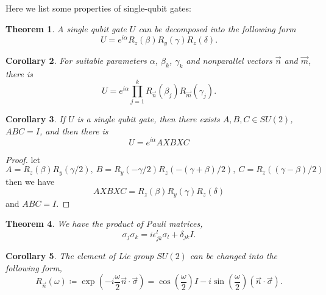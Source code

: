 \documentclass[a4paper,10pt]{book}
\newtheorem{theorem}{Theorem}[section]
\newtheorem{corollary}[theorem]{Corollary}
\numberwithin{equation}{section}
\begin{document}
Here we list some properties of single-qubit gates:
\begin{theorem}\label{the:EulerAngle}
    A single qubit gate $U$ can be decomposed into the following form
    \begin{equation}
        U=e^{i\alpha}R_{z}(\beta)R_{y}(\gamma)R_{z}(\delta).
    \end{equation}
\end{theorem}
\begin{corollary}\label{cor:DecompositionByTwoAxis}
    For suitable parameters $\alpha$, $\beta_{k}$, $\gamma_{k}$ and nonparallel vectors $\vec{n}$ and $\vec{m}$, there is
    \begin{equation}
        U=e^{i\alpha}\prod_{j=1}^{k}R_{\vec{n}}(\beta_{j})R_{\vec{m}}(\gamma_{j}).
    \end{equation}
\end{corollary}
\begin{corollary}\label{DecToAXBXC}
    If $U$ is a single qubit gate, then there exists $A,B,C \in SU(2)$, $ABC=I$, and then there is
    \begin{equation}
        U = e^{i\alpha}AXBXC
    \end{equation}
\end{corollary}
\begin{proof}
    let
    \begin{equation*}
        A=R_{z}(\beta)R_{y}(\gamma/2),\ B=R_{y}(-\gamma/2)R_{z}(-(\gamma+\beta)/2),\ C=R_{z}((\gamma-\beta)/2)
    \end{equation*}
    then we have
    \begin{equation}
        AXBXC=R_{z}(\beta)R_{y}(\gamma)R_{z}(\delta)
    \end{equation}
    and $ABC=I$.
\end{proof}
\begin{theorem}\label{ProductOfPauli}
    We have the product of Pauli matrices,
    \begin{equation}
        \sigma_{j}\sigma_{k} = i\epsilon_{jk}^{l}\sigma_{l}+\delta_{jk}I.
    \end{equation}
\end{theorem}
\begin{corollary}\label{cor:CompositionOfRotation}
    The element of Lie group $SU(2)$ can be changed into the following form,
    \begin{equation}
        R_{\vec{n}}(\omega) \coloneqq \exp\left(-i\frac{\omega}{2}\vec{n}\cdot\vec{\sigma}\right)=\cos \left(\frac{\omega}{2}\right)I-i\sin \left(\frac{\omega}{2}\right)(\vec{n}\cdot\vec{\sigma}).
    \end{equation}
\end{corollary}
\end{document}
